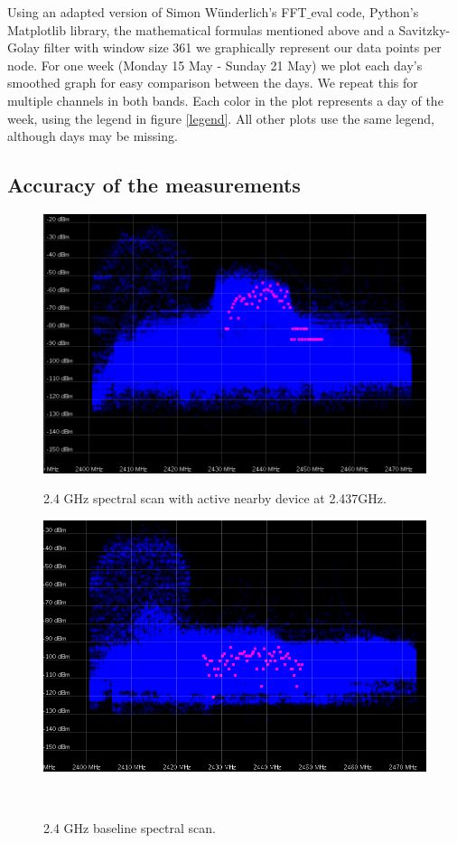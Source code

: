 \documentclass[a4paper, 11pt]{article}
\begin{document}
Using an adapted version of Simon W{\"u}nderlich's FFT$\_$eval code, Python's Matplotlib library, the mathematical formulas mentioned above and a Savitzky-Golay filter with window size 361 we graphically represent our data points per node. For one week (Monday 15 May - Sunday 21 May) we plot each day's smoothed graph for easy comparison between the days. We repeat this for multiple channels in both bands. Each color in the plot represents a day of the week, using the legend in figure \ref{legend}. All other plots use the same legend, although days may be missing.



\subsection{Accuracy of the measurements} \label{accuracy}

\begin{figure}[ht]
\begin{minipage}[t]{0.45\textwidth}
\centering
\includegraphics[width=\textwidth]{24check.png}
\caption{2.4 GHz spectral scan with active nearby device at 2.437GHz.}
\label{fig_24}
\end{minipage}\hfill
\begin{minipage}[t]{0.45\textwidth}
\centering
\includegraphics[width=\textwidth]{24check_nodata.png}
\caption{2.4 GHz baseline spectral scan.}
\label{fig_24nodata}
\end{minipage}\
\end{figure}
\end{document}
